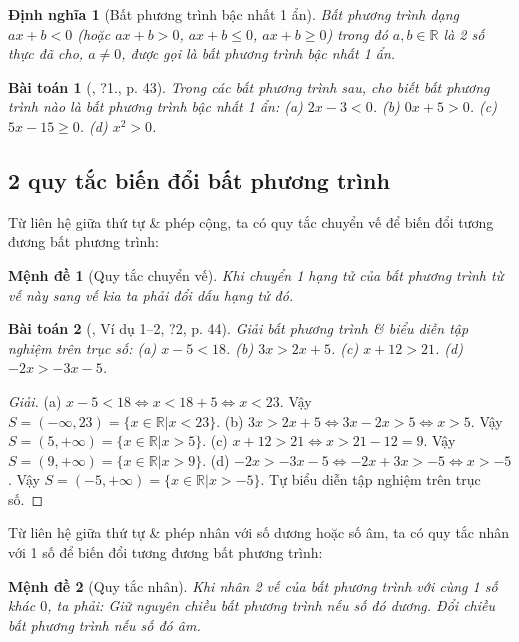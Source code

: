 \documentclass{article}
\newtheorem{baitoan}{Bài toán}
\newtheorem{dinhnghia}{Định nghĩa}
\newtheorem{menhde}{Mệnh đề}
\begin{document}
\begin{dinhnghia}[Bất phương trình bậc nhất 1 ẩn]
	Bất phương trình dạng $ax + b < 0$ (hoặc $ax + b > 0$, $ax + b\le0$, $ax + b\ge0$) trong đó $a,b\in\mathbb{R}$ là 2 số thực đã cho, $a\ne0$, được gọi là \emph{bất phương trình bậc nhất 1 ẩn}.
\end{dinhnghia}

\begin{baitoan}[\cite{SGK_Toan_8_tap_2}, ?1., p. 43]
	Trong các bất phương trình sau, cho biết bất phương trình nào là bất phương trình bậc nhất 1 ẩn: (a) $2x - 3 < 0$. (b) $0x + 5 > 0$. (c) $5x - 15\ge0$. (d) $x^2 > 0$.
\end{baitoan}

\subsection{2 quy tắc biến đổi bất phương trình}
Từ liên hệ giữa thứ tự \& phép cộng, ta có quy tắc chuyển vế để biến đổi tương đương bất phương trình:

\begin{menhde}[Quy tắc chuyển vế]
	Khi chuyển 1 hạng tử của bất phương trình từ vế này sang vế kia ta phải đổi dấu hạng tử đó.
\end{menhde}

\begin{baitoan}[\cite{SGK_Toan_8_tap_2}, Ví dụ 1--2, ?2, p. 44]
	Giải bất phương trình \& biểu diễn tập nghiệm trên trục số: (a) $x - 5 < 18$. (b) $3x > 2x + 5$. (c) $x + 12 > 21$. (d) $-2x > -3x - 5$.
\end{baitoan}

\begin{proof}[Giải]
	(a) $x - 5 < 18\Leftrightarrow x < 18 + 5\Leftrightarrow x < 23$. Vậy $S = (-\infty,23) = \{x\in\mathbb{R}|x < 23\}$. (b) $3x > 2x + 5\Leftrightarrow3x - 2x > 5\Leftrightarrow x > 5$. Vậy $S = (5,+\infty) = \{x\in\mathbb{R}|x > 5\}$. (c) $x + 12 > 21\Leftrightarrow x > 21 - 12 = 9$. Vậy $S = (9,+\infty) = \{x\in\mathbb{R}|x > 9\}$. (d) $-2x > -3x - 5\Leftrightarrow -2x + 3x > -5\Leftrightarrow x > -5$. Vậy $S = (-5,+\infty) = \{x\in\mathbb{R}|x > -5\}$. Tự biểu diễn tập nghiệm trên trục số.
\end{proof}
Từ liên hệ giữa thứ tự \& phép nhân với số dương hoặc số âm, ta có quy tắc nhân với 1 số để biến đổi tương đương bất phương trình:

\begin{menhde}[Quy tắc nhân]
	Khi nhân 2 vế của bất phương trình với cùng 1 số khác $0$, ta phải: Giữ nguyên chiều bất phương trình nếu số đó dương. Đổi chiều bất phương trình nếu số đó âm.
\end{menhde}
\end{document}
